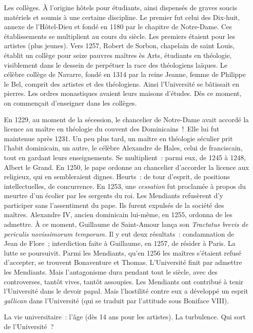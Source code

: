 \documentclass[french,twoside]{book} %
\def\mednobreak{\ifdim\lastskip<\medskipamount
  \removelastskip\nopagebreak\medskip\fi}
\newcommand{\labelblock}[1]{\medbreak{\noindent\color{rubric}\bfseries #1}\par\mednobreak}
\begin{document}
\noindent Les collèges. À l’origine hôtels pour étudiants, ainsi dispensés de graves soucis matériels et soumis à une certaine discipline. Le premier fut celui des Dix-huit, annexe de l’Hôtel-Dieu et fondé en 1180 par le chapitre de Notre-Dame. Ces établissements se multiplient au cours du siècle. Les premiers étaient pour les artistes (plus jeunes). Vers 1257, Robert de Sorbon, chapelain de saint Louis, établit un collège pour seize pauvres maîtres ès Arts, étudiants en théologie, visiblement dans le dessein de perpétuer la race des théologiens laïques. Le célèbre collège de Navarre, fondé en 1314 par la reine Jeanne, femme de Philippe le Bel, comprit des artistes et des théologiens. Ainsi l’Université se bâtissait en pierres. Les ordres monastiques avaient leurs maisons d’études. Dès ce moment, on commençait d’enseigner dans les collèges.\par

\labelblock{Les ordres mendiants.}

\noindent  {}
\label{p118} En 1229, au moment de la sécession, le chancelier de Notre-Dame avait accordé la licence au maître en théologie du couvent des Dominicains ! Elle lui fut maintenue après 1231. Un peu plus tard, un maître en théologie séculier prit l’habit dominicain, un autre, le célèbre Alexandre de Hales, celui de franciscain, tout en gardant leurs enseignements. Se multiplient : parmi eux, de 1245 à 1248, Albert le Grand. En 1250, le pape ordonne au chancelier d’accorder la licence aux religieux, qui en sembleraient dignes. Heurts : de tour d’esprit, de positions intellectuelles, de concurrence. En 1253, une \emph{cessation} fut proclamée à propos du meurtre d’un écolier par les sergents du roi. Les Mendiants refusèrent d’y participer sans l’assentiment du pape. Ils furent expulsés de la société des maîtres. Alexandre IV, ancien dominicain lui-même, en 1255, ordonna de les admettre. À ce moment, Guillaume de Saint-Amour lança son {\itshape Tractatus brevis de periculis novissimorum temporum.} Il y eut deux résultats : condamnation de Jean de Flore ; interdiction faite à Guillaume, en 1257, de résider à Paris. La lutte se poursuivit. Parmi les Mendiants, qu’en 1256 les maîtres s’étaient refusé d’accepter, se trouvent Bonaventure et Thomas. L’Université finit par admettre les Mendiants. Mais l’antagonisme dura pendant tout le siècle, avec des controverses, tantôt vives, tantôt assoupies. Les Mendiants ont contribué à tenir l’Université dans le devoir papal. Mais l’hostilité contre eux a développé un esprit \emph{gallican} dans l’Université (qui se traduit par l’attitude sous Boniface VIII).\par
La vie universitaire : l’âge (dès 14 ans pour les artistes). La turbulence. Qui sort de l’Université ?
\end{document}
